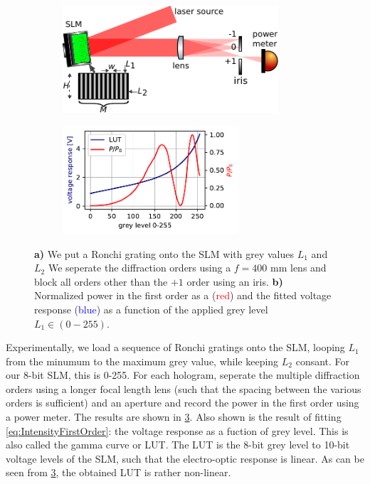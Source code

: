\begin{figure}
	\begin{subfigure}{.54\linewidth}
		\includegraphics[height=4cm]{figures/LUTcalibrationSetup.pdf}
		\caption{}
		\label{fig:LUTCalibrationSetup}
	\end{subfigure}
	\hfill
	\begin{subfigure}{.44\linewidth}
		\includegraphics[height=4cm]{figures/lut_plot.pdf}
		\caption{}
		\label{fig:LUTcalibration}
	\end{subfigure}
	\caption{\textbf{a)} We put a Ronchi grating onto the SLM with grey values $L_1$ and $L_2$ We seperate the diffraction orders using a $f=400$ mm lens and block all orders other than the $+1$ order using an iris. 
	\textbf{b) }Normalized power in the first order as a (\textcolor{red}{red}) and the fitted voltage response (\textcolor{blue}{blue}) as a function of the applied grey level $L_1 \in (0-255)$.}
\end{figure}

Experimentally, we load a sequence of Ronchi gratings onto the SLM, looping $L_1$ from the minumum to the maximum grey value, while keeping $L_2$ consant. 
For our 8-bit SLM, this is 0-255. For each hologram, seperate the multiple diffraction orders using a longer focal length lens (such that the spacing between the various orders is sufficient) and an aperture and record the power in the first order using a power meter. 
The results are shown in \cref{fig:LUTcalibration}. Also shown is the result of fitting \cref{eq:IntensityFirstOrder}: the voltage response as a fuction of grey level. 
This is also called the gamma curve or \ac{LUT}.
The LUT is the 8-bit grey level to 10-bit voltage levels of the SLM, such that the electro-optic response is linear. 
As can be seen from \cref{fig:LUTcalibration}, the obtained LUT is rather non-linear.

